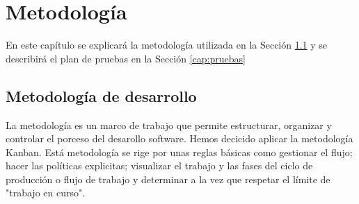 \chapter{Metodología}
\label{cap:metodologia}
En este capítulo se explicará la metodología utilizada en la Sección \ref{cap:Kanban} y se describirá el plan de pruebas en la Sección \ref{cap:pruebas}
\section{Metodología de desarrollo}
\label{cap:Kanban}
La metodología es un marco de trabajo que permite estructurar, organizar y controlar el porceso del desarollo software. Hemos decicido aplicar la metodología Kanban. Está metodología se rige por unas reglas básicas como gestionar el flujo; hacer las políticas explicitas; visualizar el trabajo y las fases del ciclo de producción o flujo de trabajo y determinar a la vez que respetar el límite de "trabajo en curso". 

